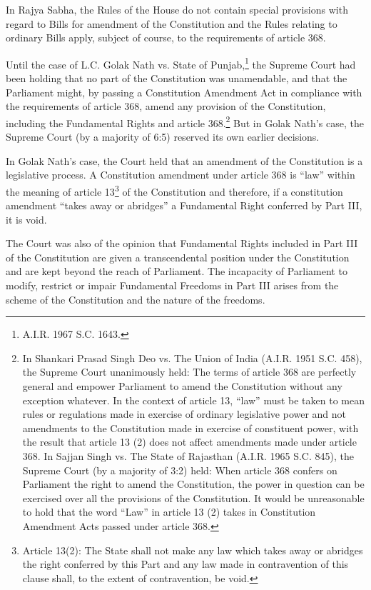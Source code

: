 \begin{multicols}{2}
\noi
In Rajya Sabha, the Rules of the House do not contain special provisions with regard to Bills
for amendment of the Constitution and the Rules relating to ordinary Bills apply, subject of
course, to the requirements of article 368.


\noi
Until the case of L.C. Golak Nath vs. State of Punjab,\footnote{A.I.R. 1967 S.C. 1643.} the Supreme Court had been holding
that no part of the Constitution was unamendable, and that the Parliament might, by passing a
Constitution Amendment Act in compliance with the requirements of article 368, amend any
provision of the Constitution, including the Fundamental Rights and article 368.\footnote{In Shankari Prasad Singh Deo vs. The Union of India (A.I.R. 1951 S.C. 458), the Supreme Court unanimously held: The terms of article 368 are perfectly general and empower Parliament to amend the Constitution without any exception whatever. In the context of article 13, “law” must be taken to mean rules or regulations made in exercise of ordinary legislative power and not amendments to the Constitution made in exercise of constituent power, with the result that article 13 (2) does not affect amendments made under article 368. In Sajjan Singh vs.
The State of Rajasthan (A.I.R. 1965 S.C. 845), the Supreme Court (by a majority of 3:2) held: When article 368
confers on Parliament the right to amend the Constitution, the power in question can be exercised over all the
provisions of the Constitution. It would be unreasonable to hold that the word “Law” in article 13 (2) takes in
Constitution Amendment Acts passed under article 368.} But in
Golak Nath’s case, the Supreme Court (by a majority of 6:5) reserved its own earlier decisions.

\noi
In Golak Nath’s case, the Court held that an amendment of the Constitution is a legislative
process. A Constitution amendment under article 368 is “law” within the meaning of article
13\footnote{Article 13(2): The State shall not make any law which takes away or abridges the right conferred by this Part
and any law made in contravention of this clause shall, to the extent of contravention, be void.} of the Constitution and therefore, if a constitution amendment “takes away or abridges”
a Fundamental Right conferred by Part III, it is void.

\noi
The Court was also of the opinion that Fundamental Rights included in Part III of the
Constitution are given a transcendental position under the Constitution and are kept beyond
the reach of Parliament. The incapacity of Parliament to modify, restrict or impair
Fundamental Freedoms in Part III arises from the scheme of the Constitution and the nature
of the freedoms.


\end{multicols}
